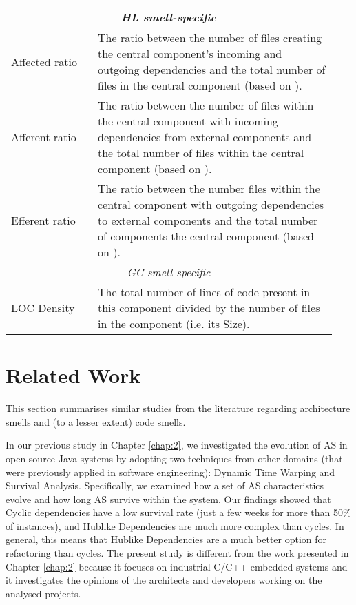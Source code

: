 \begin{table}[tbp]
\begin{tabular}{p{0.25\linewidth}|p{0.69\linewidth}}
        \multicolumn{2}{c}{\itshape HL smell-specific}\\\midrule
        Affected ratio & The ratio between the number of files creating the central component's incoming and outgoing dependencies and the total number of files in the central component (based on \cite{Abdeen2011}). \\  
        Afferent ratio & The ratio between the number of files within the central component with incoming dependencies from external components and the total number of files within the central component (based on \cite{Abdeen2011}). \\ 
        Efferent ratio & The ratio between the number files within the central component with outgoing dependencies to external components and the total number of components the central component (based on \cite{Abdeen2011}). \\\midrule
        \multicolumn{2}{c}{\itshape GC smell-specific}\\\midrule
        LOC Density & The total number of lines of code present in this component divided by the number of files in the component (i.e. its Size). \\ \bottomrule
    \end{tabular}
\end{table}


\section{Related Work}\label{c4:sec:related-work}
This section summarises similar studies from the literature regarding architecture smells and (to a lesser extent) code smells.

In our previous study in Chapter \ref{chap:2}, we investigated the evolution of AS in open-source Java systems by adopting two techniques from other domains (that were previously applied in software engineering): Dynamic Time Warping and Survival Analysis. Specifically, we examined how a set of AS characteristics evolve and how long AS survive within the system.
Our findings showed that Cyclic dependencies have a low survival rate (just a few weeks for more than 50\% of instances), and Hublike Dependencies are much more complex than cycles. In general, this means that Hublike Dependencies are a much better option for refactoring than cycles. 
The present study is different from the work presented in Chapter \ref{chap:2} because it focuses on industrial C/C++ embedded systems and it investigates the opinions of the architects and developers working on the analysed projects.

